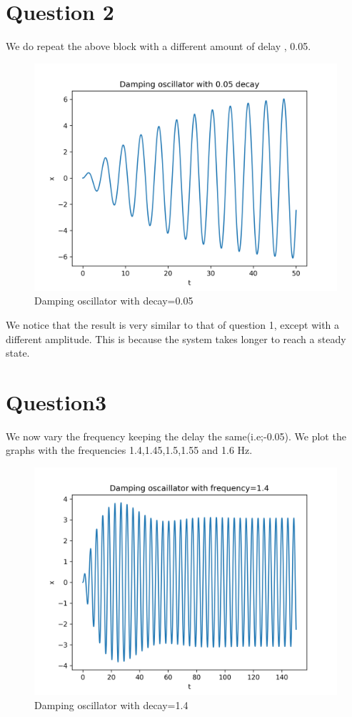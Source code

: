 \documentclass[11pt, a4paper]{article}
\begin{document}
\section*{Question 2}
We do repeat the above block with a different amount of delay , 0.05.



\begin{figure}[!tbh]
\centering
\includegraphics[scale=0.5]{assgn7_plot2.png} 
\caption{Damping oscillator with decay=0.05}
\label{fig2}
\end{figure}

We notice that the result is very similar to that of question 1, except with a
different amplitude. This is because the system takes longer to reach a steady
state.

\section*{Question3}
We now vary the frequency keeping the delay the same(i.e;-0.05). We plot the graphs with the frequencies 1.4,1.45,1.5,1.55 and 1.6 Hz.

\begin{figure}[!tbh]
\centering
\includegraphics[scale=0.65]{assgn7_plot3.png} 
\caption{Damping oscillator with decay=1.4}
\label{fig3}
\end{figure}
\end{document}
